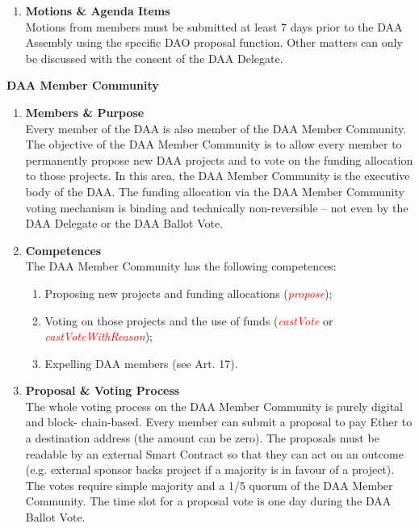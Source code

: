 \begin{enumerate}[label=\textbf{\arabic*.}]
    \item \textbf{Motions \& Agenda Items} \\ %
    Motions from members must be submitted at least 7 days prior to the DAA Assembly using the specific DAO proposal function.
    Other matters can only be discussed with the consent of the DAA Delegate.
\end{enumerate}


\item \textbf{DAA Member Community} \\
\begin{enumerate}[label=\textbf{\arabic*.}]
    \item \textbf{Members \& Purpose} \\
    Every member of the DAA is also member of the DAA Member Community.
    The objective of the DAA Member Community is to allow every member to permanently propose new DAA projects and to vote on the funding allocation to those projects. %
    In this area, the DAA Member Community is the executive body of the DAA.
    The funding allocation via the DAA Member Community voting mechanism is binding and technically non-reversible – not even by the DAA Delegate or the DAA Ballot Vote.

    \item \textbf{Competences} \\
    The DAA Member Community has the following competences:
    \begin{enumerate}
        [label=(\alph*)]
        \item Proposing new projects and funding allocations (\textcolor{red}{\emph{propose}});
        \item Voting on those projects and the use of funds (\textcolor{red}{\emph{castVote}} or \textcolor{red}{\emph{castVoteWithReason}});
        \item Expelling DAA members (see Art. 17).
    \end{enumerate}

    \item \textbf{Proposal \& Voting Process} \\
    The whole voting process on the DAA Member Community is purely digital and block- chain-based.
    Every member can submit a proposal to pay Ether to a destination address (the amount can be zero). %
    The proposals must be readable by an external Smart Contract so that they can act on an outcome (e.g. external sponsor backs project if a majority is in favour of a project). %
    The votes require simple majority and a 1/5 quorum of the DAA Member Community.
    The time slot for a proposal vote is one day during the DAA Ballot Vote.
\end{enumerate}

